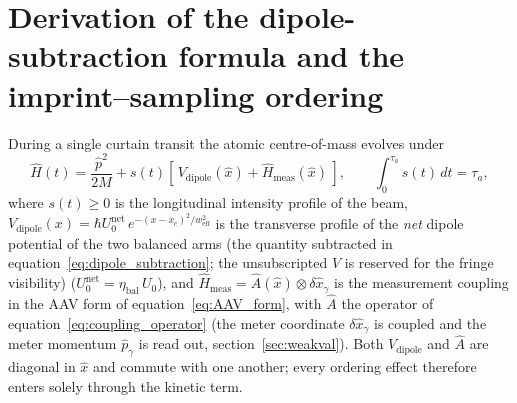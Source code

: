 \documentclass[11pt,a4paper]{article}
\begin{document}
\section{Derivation of the dipole-subtraction formula and the imprint--sampling ordering}
\label{app:dipole}

During a single curtain transit the atomic centre-of-mass evolves under
\begin{equation}
\hat H(t) = \frac{\hat p^2}{2M} + s(t)\left[\,V_\text{dipole}(\hat x) + \hat H_\text{meas}(\hat x)\,\right],
\qquad \int_0^{\tau_a}\! s(t)\,dt = \tau_a,
\label{eq:appA_hamiltonian}
\end{equation}
where $s(t) \geq 0$ is the longitudinal intensity profile of the beam, $V_\text{dipole}(x) = \hbar U_0^\text{net}\, e^{-(x - x_c)^2/w_\text{eff}^2}$ is the transverse profile of the \emph{net} dipole potential of the two balanced arms (the quantity subtracted in equation~\eqref{eq:dipole_subtraction}; the unsubscripted $V$ is reserved for the fringe visibility) ($U_0^\text{net} = \eta_\text{bal}\,U_0$), and $\hat H_\text{meas} = \hat A(\hat x)\otimes\delta\hat x_\gamma$ is the measurement coupling in the AAV form of equation~\eqref{eq:AAV_form}, with $\hat A$ the operator of equation~\eqref{eq:coupling_operator} (the meter coordinate $\delta\hat x_\gamma$ is coupled and the meter momentum $\hat p_\gamma$ is read out, section~\ref{sec:weakval}). Both $V_\text{dipole}$ and $\hat A$ are diagonal in $\hat x$ and commute with one another; every ordering effect therefore enters solely through the kinetic term.
\end{document}
